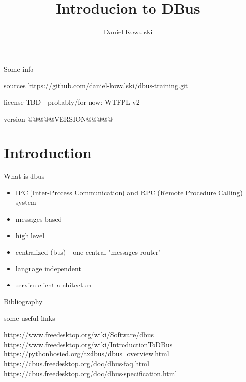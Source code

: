\documentclass{beamer}
\title[Introducion to DBus]{Introducion to DBus}
\author{Daniel Kowalski}
\date{}
\begin{document}
\begin{frame}
\titlepage
\end{frame}


\begin{frame}{Some info}
  \begin{block}{sources}
    \url{https://github.com/daniel-kowalski/dbus-training.git}
  \end{block}
  \vfill
  \begin{block}{license}
    TBD - probably/for now: WTFPL v2
  \end{block}
  \vfill
  \begin{block}{version}
    @@@@@VERSION@@@@@
  \end{block}
\end{frame}

\begin{frame}
  \tableofcontents
\end{frame}

\section{Introduction}

\begin{frame}{What is dbus}
  \begin{itemize}
    \item IPC (Inter-Process Communication) and RPC (Remote Procedure Calling) system
    \item messages based
    \item high level
    \item centralized (bus) - one central "messages router"
    \item language independent
    \item service-client architecture
  \end{itemize}
\end{frame}

\begin{frame}{Bibliography}
  \begin{exampleblock}{some useful links}
    \begin{small}
      \url{https://www.freedesktop.org/wiki/Software/dbus}\\
      \url{https://www.freedesktop.org/wiki/IntroductionToDBus}\\
      \url{https://pythonhosted.org/txdbus/dbus\_overview.html}\\
      \url{https://dbus.freedesktop.org/doc/dbus-faq.html}\\
      \url{https://dbus.freedesktop.org/doc/dbus-specification.html}\\
    \end{small}  
  \end{exampleblock}
\end{frame}
\end{document}
